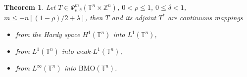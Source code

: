 \documentclass[12pt, reqno]{amsart}
\newtheorem{theorem}{Theorem}[section]
\theoremstyle{definition}
\theoremstyle{remark}
\numberwithin{equation}{section}
\begin{document}
\begin{theorem}
    Let $T \in \Psi^m_{\rho, \delta}(\mathbb{T}^n \times \mathbb{Z}^n) $, $0 < \rho \leq 1$, $0 \leq \delta < 1$, $m \leq - n [(1-\rho)/2 + \lambda] $, then $T$ and its adjoint $T^*$ are continuous mappings
    \begin{itemize}
        \item[(a)] from the Hardy space $H^1(\mathbb{T}^n)$ into $L^1(\mathbb{T}^n)$,\\
        \item[(b)] from $L^1(\mathbb{T}^n)$ into weak-$L^1(\mathbb{T}^n)$,\\
        \item[(c)] from $L^\infty(\mathbb{T}^n)$ into $\text{BMO}(\mathbb{T}^n)$.
    \end{itemize}
\end{theorem}
\end{document}
